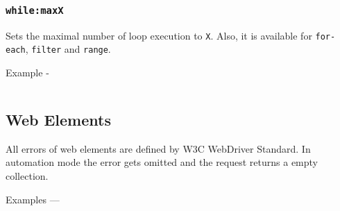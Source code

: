 \subsubsection{\texttt{while:maxX}}

Sets the maximal number of loop execution to \texttt{X}. Also, it is available for \texttt{for-each}, \texttt{filter} and \texttt{range}.

Example -
\inputminted[linenos]{icl}{../sources/maxlimitsheet.icL}

\subsection{Web Elements}

All errors of web elements are defined by W3C WebDriver Standard. In automation mode the error  gets omitted and the request returns a empty collection.

Examples —
\inputminted[linenos]{icl}{../sources/webelementsheet.icL}

